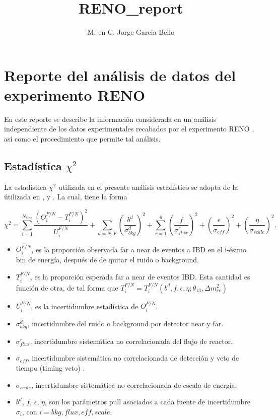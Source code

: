 \documentclass[10pt,a4paper]{report}
\author{M. en C. Jorge Garcia Bello}
\title{RENO_report}
\begin{document}
\chapter*{Reporte del análisis de datos del experimento RENO}

En este reporte se describe la información considerada en un 
análisis independiente de los datos experimentales recabados
por el experimento RENO \cite{Bak:2018ydk}, así como el procedimiento que permite 
tal análisis.

\section*{Estadística $\chi^2$}

La estadística $\chi^2$ utilizada en el presente análisis estadístico
se adopta de la útilizada en \cite{Bak:2018ydk}, \cite{Seo:2016uom} y
\cite{RENO:2015ksa}. La cual, tiene la forma

\begin{equation}
\chi^2=\sum_{i=1}^{N_{bins}} 
\frac{\left(O_{i}^{F/N}-T_{i}^{F/N}\right)^2}
     {U_{i}^{F/N}}
	  +
	  \sum_{d=N,F} \left(
	                  \frac{b^{d}}{\sigma_{bkg}^d}
	               \right)^2
	  +
	  \sum_{r=1}^{6}\left(
	                  \frac{f}{\sigma^r_{flux}}
	                \right)^2
	  + \left(\frac{\epsilon}{\sigma_{eff}}\right)^2
	  + \left(\frac{\eta}{\sigma_{scale}}\right)^2.
\end{equation}

\begin{itemize}
  \item $O_{i}^{F/N}$, es la proporción
  observada far a near de eventos a IBD 
  en el i-ésimo bin de energía, después de 
  de quitar el ruido o background.
  \item $T_{i}^{F/N}$, es la proporción 
  esperada far a near de eventos IBD. Esta 
  cantidad es función de otra, de tal 
  forma que $T_{i}^{F/N}=T_{i}^{F/N}(b^d,f,
  \epsilon,\eta;\theta_{13},\Delta m^2_{ee})$
  \item $U_{i}^{F/N}$, es la incertidumbre 
  estadística de $O_{i}^{F/N}$.
  \item $\sigma^{d}_{bkg}$, incertidumbre 
  del ruido o background por detector 
  near y far.
  \item $\sigma^{r}_{flux}$, incertidumbre 
  sistemática no correlacionada del flujo 
  de reactor.
  \item $\sigma_{eff}$, incertidumbre 
  sistemática no correlacionada de 
  detección y veto de tiempo (timing veto) .
  \item $\sigma_{scale}$, incertidumbre 
  sistemática no correlacionada de 
  escala de energía.
  \item $b^d$, $f$, $\epsilon$, $\eta$, son 
  los parámetros pull asociados a cada fuente 
  de incertidumbre $\sigma_{i}$, con $i=bkg,
  flux,eff,scale$.
\end{itemize}
\end{document}
